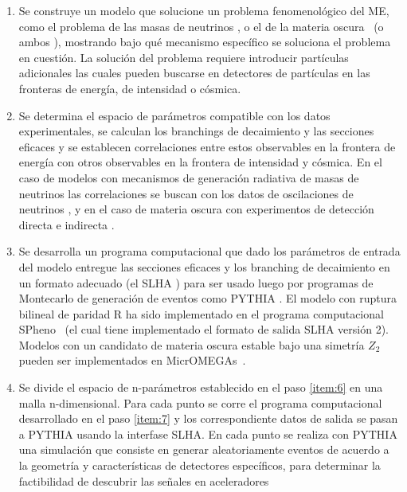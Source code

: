\begin{enumerate}
\item Se construye un modelo que solucione un problema fenomenológico
  del ME, como el problema de las masas de neutrinos
  \cite{Hirsch:2000ef}, o el de la materia oscura~\cite{Bernal:2009tt,Bernal:2009jc} (o ambos
  \cite{Hirsch:2005ag,Restrepo:2011rj}), mostrando bajo qué mecanismo
  específico se soluciona el problema en cuestión. La solución del
  problema requiere introducir partículas adicionales las cuales
  pueden buscarse en detectores de partículas en las fronteras de
  energía, de intensidad o cósmica.
  \label{item:5}
\item Se determina el espacio de parámetros compatible con los datos
  experimentales, se calculan los branchings de decaimiento y las
  secciones eficaces y se establecen correlaciones entre estos
  observables en la frontera de energía con otros observables en la
  frontera de intensidad y cósmica. En el caso de modelos con
  mecanismos de generación radiativa de masas de neutrinos las
  correlaciones se buscan con los datos de oscilaciones de neutrinos
  \cite{Diaz:2003as}, y en el caso de materia oscura con experimentos
  de detección directa e indirecta \cite{Bernal:2009tt,Bernal:2009jc,Choi:2010xn,Restrepo:2011rj}.
  \label{item:6}
\item Se desarrolla un programa computacional que dado los parámetros
  de entrada del modelo entregue las secciones eficaces y los
  branching de decaimiento en un formato adecuado (el SLHA
  \cite{Allanach:2008qq}) para ser usado luego por programas de Montecarlo
  de generación de eventos como PYTHIA \cite{Sjostrand:2006za}. El
  modelo con ruptura bilineal de paridad R ha sido implementado en el
  programa computacional SPheno~\cite{Porod:2003um} (el cual tiene
  implementado el formato de salida SLHA versión 2). Modelos con un
  candidato de materia oscura estable bajo una simetría $Z_2$ pueden
  ser implementados en MicrOMEGAs~\cite{Belanger:2006is,Belanger:2008sj,Belanger:2010gh}.
  \label{item:7}
\item Se divide el espacio de n-parámetros establecido en el paso
  \ref{item:6} en una malla n-dimensional. Para cada punto se corre el
  programa computacional desarrollado en el paso \ref{item:7} y los
  correspondiente datos de salida se pasan a PYTHIA usando la
  interfase SLHA. En cada punto se realiza con PYTHIA una simulación
  que consiste en generar aleatoriamente eventos de acuerdo a la
  geometría y características de detectores específicos, para
  determinar la factibilidad de descubrir las señales en aceleradores

\end{enumerate}
